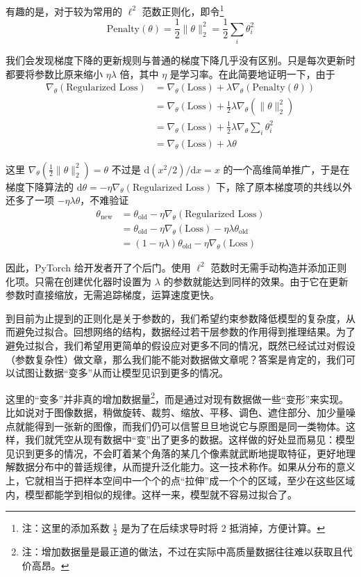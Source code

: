 有趣的是，对于较为常用的 $\ell^2$ 范数正则化，即令\footnote{注：这里的添加系数 $\frac12$ 是为了在后续求导时将 2 抵消掉，方便计算。}
\[
    \text{Penalty}(\theta) = \frac12 \|\theta\|_2^2 = \frac12 \sum_{i} \theta_i^2
\]

我们会发现梯度下降的更新规则与普通的梯度下降几乎没有区别。只是每次更新时都要将参数比原来缩小 $\eta\lambda$ 倍，其中 $\eta$ 是学习率。在此简要地证明一下，由于
\[
\begin{aligned}
    \nabla_\theta(\text{Regularized Loss}) &= \nabla_\theta(\text{Loss}) + \lambda   \nabla_\theta(\text{Penalty}(\theta)) \\
    &= \nabla_\theta(\text{Loss}) + \frac12\lambda   \nabla_\theta(\|\theta\|_2^2) \\
    &= \nabla_\theta(\text{Loss}) + \frac12 \lambda \nabla_\theta\sum_{i} \theta_i^2 \\
    &= \nabla_\theta(\text{Loss}) + \lambda   \theta
\end{aligned}
\]

这里 $\nabla_\theta (\frac12\|\theta\|_2^2) = \theta$ 不过是 $\mathrm{d}(x^2 / 2) / \mathrm{d}x = x$ 的一个高维简单推广，于是在梯度下降算法的 $\mathrm{d}\theta = - \eta \nabla_\theta (\text{Regularized Loss})$ 下，除了原本梯度项的共线以外还多了一项 $- \eta \lambda \theta$，不难验证
\[
\begin{aligned}
    \theta_{\text{new}} &= \theta_{\text{old}} - \eta \nabla_\theta (\text{Regularized Loss}) \\
    &= \theta_{\text{old}} - \eta \nabla_\theta (\text{Loss}) - \eta \lambda \theta_{\text{old}} \\
    &= (1 - \eta \lambda) \theta_{\text{old}} - \eta \nabla_\theta (\text{Loss})
\end{aligned}
\]

因此，PyTorch 给开发者开了个后门。使用 $\ell^2$ 范数时无需手动构造并添加正则化项。只需在创建优化器时设置为 $\lambda$ 的参数就能达到同样的效果。由于它在更新参数时直接缩放，无需追踪梯度，运算速度更快。

到目前为止提到的正则化是关于参数的，我们希望约束参数降低模型的复杂度，从而避免过拟合。回想网络的结构，数据经过若干层参数的作用得到推理结果。为了避免过拟合，我们希望用更简单的假设应对更多不同的情况，既然已经试过对假设（参数复杂性）做文章，那么我们能不能对数据做文章呢？答案是肯定的，我们可以试图让数据“变多”从而让模型见识到更多的情况。

这里的“变多”并非真的增加数据量\footnote{注：增加数据量是最正道的做法，不过在实际中高质量数据往往难以获取且代价高昂。}，而是通过对现有数据做一些“变形”来实现。比如说对于图像数据，稍做旋转、裁剪、缩放、平移、调色、遮住部分、加少量噪点就能得到一张新的图像，而我们仍可以信誓旦旦地说它与原图是同一类物体。这样，我们就凭空从现有数据中“变”出了更多的数据。这样做的好处显而易见：模型见识到更多的情况，不会盯着某个角落的某几个像素就武断地提取特征，更好地理解数据分布中的普适规律，从而提升泛化能力。这一技术称作。如果从分布的意义上，它就相当于把样本空间中一个个的点“拉伸”成一个个的区域，至少在这些区域内，模型都能学到相似的规律。这样一来，模型就不容易过拟合了。

